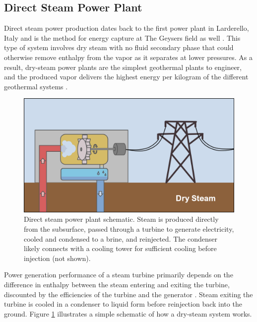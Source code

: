 \subsection{Direct Steam Power Plant}\label{ch2:steam_plant}
Direct steam power production dates back to the first power plant in Larderello, Italy and is the method for energy capture at The Geysers field as well \citep[p.\ 131-132]{dipippo_geothermal_2012}. This type of system involves dry steam with no fluid secondary phase that could otherwise remove enthalpy from the vapor as it separates at lower pressures. As a result, dry-steam power plants are the simplest geothermal plants to engineer, and the produced vapor delivers the highest energy per kilogram of the different geothermal systems \citep[p.\ 205]{glassley_geothermal_2015}.  
\begin{figure}[!htp]%
\centering
\includegraphics[width=.9\textwidth]{templates/images/Figure-SteamPlant_Schematic.png}
\caption[Direct steam power plant schematic]{Direct steam power plant schematic. Steam is produced directly from the subsurface, passed through a turbine to generate electricity, cooled and condensed to a brine, and reinjected. The condenser likely connects with a cooling tower for sufficient cooling before injection (not shown).}
\label{fig:steam_plant}
\end{figure}

Power generation performance of a steam turbine primarily depends on the difference in enthalpy between the steam entering and exiting the turbine, discounted by the efficiencies of the turbine \citep[generally >85\%,][p. 206]{glassley_geothermal_2015} and the generator \citep[$\approx$98\%,][p.\ 116]{augustine_hydrothermal_2009}. Steam exiting the turbine is cooled in a condenser to liquid form before reinjection back into the ground. Figure \ref{fig:steam_plant} illustrates a simple schematic of how a dry-steam system works.


